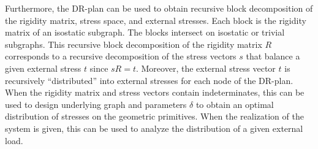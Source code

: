 



Furthermore, the DR-plan can be used to obtain recursive block decomposition of the rigidity matrix, stress space, and external stresses. Each block is the rigidity matrix of an isostatic subgraph. The blocks intersect on isostatic or trivial subgraphs. This recursive block decomposition of the rigidity matrix $R$ corresponds to a recursive decomposition of the stress vectors $s$ that balance a given external stress $t$ since $sR = t$. Moreover, the external stress vector $t$ is recursively ``distributed'' into external stresses for each node of the DR-plan. When the rigidity matrix and stress vectors contain indeterminates, this can be used to design underlying graph and parameters $\delta$ to obtain an optimal distribution of stresses on the geometric primitives. When the realization of the system is given, this can be used to analyze the distribution of a given external load.





